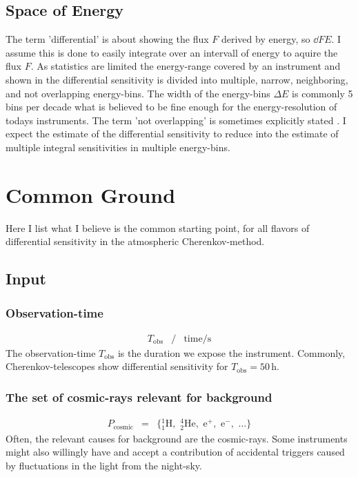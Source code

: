 \documentclass{article}%
\begin{document}
\subsection*{Space of Energy}
%
The term 'differential' is about showing the flux $F$ derived by energy, so $\dd{F}{E}$.
%
I assume this is done to easily integrate over an intervall of energy to aquire the flux $F$.
%
As statistics are limited the energy-range covered by an instrument and shown in the differential sensitivity is divided into multiple, narrow, neighboring, and not overlapping energy-bins.
%
The width of the energy-bins $\Delta E$ is commonly 5 bins per decade what is believed to be fine enough for the energy-resolution of todays instruments.
%
The term 'not overlapping' is sometimes explicitly stated \cite{cta2018baseline}.
%
I expect the estimate of the differential sensitivity to reduce into the estimate of multiple integral sensitivities in multiple energy-bins.
\section{Common Ground}
\label{SecCommonGround}
%
Here I list what I believe is the common starting point, for all flavors of differential sensitivity in the atmospheric Cherenkov-method.
%
\subsection{Input}
\subsubsection*{Observation-time}
%
\begin{eqnarray*}
T_\text{obs} &/& \text{time} / \text{s}
\end{eqnarray*}
%
The observation-time $T_\text{obs}$ is the duration we expose the instrument.
%
Commonly, Cherenkov-telescopes show differential sensitivity for $T_\text{obs} = 50\,$h.
%
\subsubsection*{The set of cosmic-rays relevant for background}
%
\begin{eqnarray*}
P_\text{cosmic} &=& \{ {_1^1}\text{H},\,\,{_2^4}\text{He},\,\,\text{e}^{+},\,\,\text{e}^{-},\,\,\dots{}\}
\end{eqnarray*}
%
Often, the relevant causes for background are the cosmic-rays. Some instruments might also willingly have and accept a contribution of accidental triggers caused by fluctuations in the light from the night-sky.
%
\end{document}
